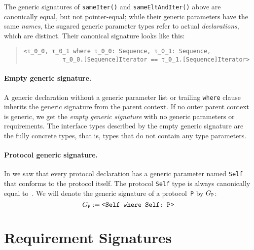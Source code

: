 \documentclass[../generics]{subfiles}
\begin{document}
The generic signatures of \texttt{sameIter()} and \texttt{sameEltAndIter()} above are canonically equal, but not pointer-equal; while their generic parameters have the same \emph{names}, the sugared generic parameter types refer to actual \emph{declarations}, which are distinct. Their canonical signature looks like this:
\begin{quote}
\begin{verbatim}
<τ_0_0, τ_0_1 where τ_0_0: Sequence, τ_0_1: Sequence,
           τ_0_0.[Sequence]Iterator == τ_0_1.[Sequence]Iterator>
\end{verbatim}
\end{quote}

\paragraph{Empty generic signature.}
A generic declaration without a generic parameter list or trailing \texttt{where} clause inherits the generic signature from the parent context. If no outer parent context is generic, we get the \emph{empty generic signature} with no generic parameters or requirements. The interface types described by the empty generic signature are the fully concrete types, that is, types that do not contain any type parameters.

\paragraph{Protocol generic signature.}
In  we saw that every protocol declaration has a generic parameter named \texttt{Self} that conforms to the protocol itself. The protocol \texttt{Self} type is always canonically equal to~\rT. We will denote the generic signature of a protocol~\texttt{P} by $G_{\texttt{P}}$:
\[
\GP := \verb|<Self where Self: P>|
\]

\section{Requirement Signatures}\label{requirement sig}
\end{document}
